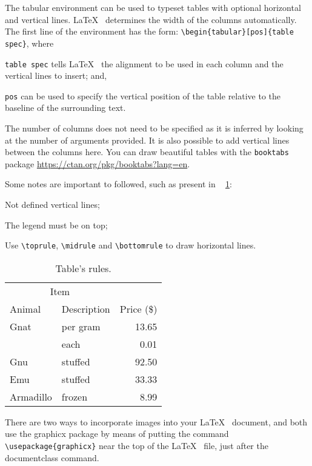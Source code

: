 The tabular environment can be used to typeset tables with optional horizontal and vertical lines. \LaTeX~ determines the width of the columns automatically. The first line of the environment has the form: 
\verb|\begin{tabular}[pos]{table spec}|, where 
\begin{inparaenum}[(1)]
\item \verb|table spec|  tells \LaTeX~ the alignment to be used in each column and the vertical lines to insert; and, 
\item \verb|pos| can be used to specify the vertical position of the table relative to the baseline of the surrounding text. 
\end{inparaenum}
The number of columns does not need to be specified as it is inferred by looking at the number of arguments provided. It is also possible to add vertical lines between the columns here. You can draw beautiful tables with the \verb|booktabs| package \url{https://ctan.org/pkg/booktabs?lang=en}.

Some notes are important to followed, such as present in \tablename~ \ref{tab:results}: 
\begin{asparaenum}[i)]
	\item Not defined vertical lines;
	\item The legend must be on top;
	\item Use \verb|\toprule|, \verb|\midrule| and \verb|\bottomrule| to draw horizontal lines.
\end{asparaenum}
 
\begin{table}[ht]
	\caption{Table's rules.}
	\label{tab:results}
\centering
\begin{tabular}{llr}
\toprule
\multicolumn{2}{c}{Item} \\
\cmidrule(r){1-2}
Animal & Description & Price (\$) 
\\
\midrule
Gnat  & per gram & 13.65 \\
      & each     &  0.01 \\
Gnu   & stuffed  & 92.50 \\
Emu   & stuffed  & 33.33 \\
Armadillo & frozen & 8.99 \\
\bottomrule
\end{tabular}
\end{table}

\begin{sloppypar}
There are two ways to incorporate images into your \LaTeX~ document, and both use the graphicx package by means of putting the command  \verb|\usepackage{graphicx}|  near the top of the \LaTeX~ file, just after the documentclass command.
\end{sloppypar}

